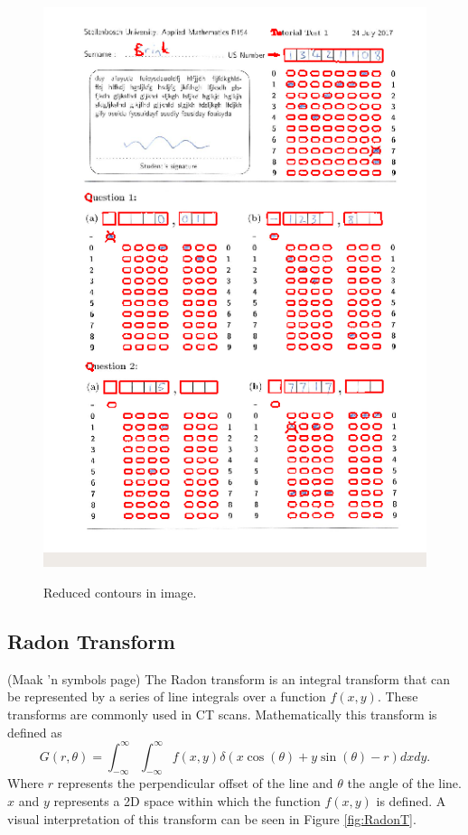 \begin{figure}
  \centering
  \includegraphics[width=14cm]{Reduced}\\
  \caption{Reduced contours in image.}
  \label{fig:reduced}
\end{figure}

\subsection{Radon Transform}
\label{sec:RadonTransform}
(Maak 'n symbols page)
The Radon transform is an integral transform that can be represented by a series of line integrals over a function $f(x,y)$. These transforms are commonly used in CT scans. Mathematically this transform is defined as $$G(r,\theta) = \int_{-\infty}^{\infty} \int_{-\infty}^{\infty} f(x, y) \delta(x\cos(\theta) + y\sin(\theta) - r) dx dy.$$Where $r$ represents the perpendicular offset of the line and $\theta$ the angle of the line. $x$ and $y$ represents a 2D space within which the function $f(x,y)$ is defined.  A visual interpretation of this transform can be seen in Figure \ref{fig:RadonT}.  


